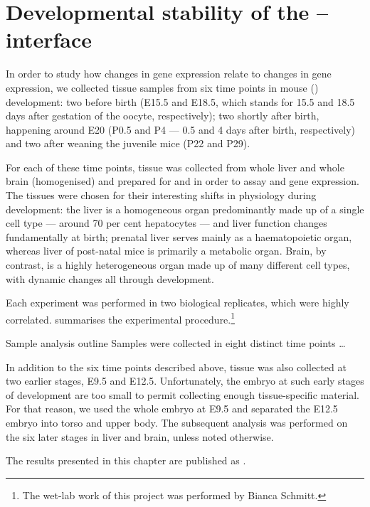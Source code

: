 \chapter{Developmental stability of the -- interface}

In order to study how changes in \mrna gene expression relate to changes in
\trna gene expression, we collected tissue samples from six time points in mouse
(\mmu) development: two before birth (E15.5 and E18.5, which stands for
\num{15.5} and \num{18.5} days after gestation of the oocyte, respectively); two
shortly after birth, happening around E20 (P0.5 and P4 --- \num{0.5} and \num{4}
days after birth, respectively) and two after weaning the juvenile mice (P22 and
P29).

For each of these time points, tissue was collected from whole liver and whole
brain (homogenised) and prepared for \rnaseq and  \chipseq in order to
assay \mrna and \trna gene expression. The tissues were chosen for their
interesting shifts in physiology during development: the liver is a homogeneous
organ predominantly made up of a single cell type --- around \num{70} per cent
hepatocytes --- and liver function changes fundamentally at birth;
prenatal liver serves mainly as a haematopoietic organ, whereas liver of
post-natal mice is primarily a metabolic organ. Brain, by contrast, is
a highly heterogeneous organ made up of many different cell types, with dynamic
changes all through development.

Each experiment was performed in two biological replicates, which were highly
correlated.  summarises the experimental
procedure.\footnote{The wet-lab work of this project was performed by Bianca
Schmitt.} 

    {Sample analysis outline}
    {Samples were collected in eight distinct time points …}

In addition to the six time points described above, tissue was also collected at
two earlier stages, E9.5 and E12.5. Unfortunately, the embryo at such early
stages of development are too small to permit collecting enough tissue-specific
material. For that reason, we used the whole embryo at E9.5 and separated the
E12.5 embryo into torso and upper body. The subsequent analysis was performed on
the six later stages in liver and brain, unless noted otherwise.

The results presented in this chapter are published as \citet{Schmitt:2014}.

